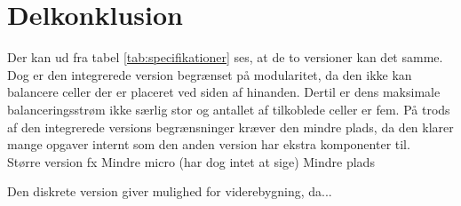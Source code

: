 \section{Delkonklusion}
Der kan ud fra tabel \ref{tab:specifikationer} ses, at de to versioner kan det samme. Dog er den integrerede version begrænset på modularitet, da den ikke kan balancere celler der er placeret ved siden af hinanden. Dertil er dens maksimale balanceringsstrøm ikke særlig stor og antallet af tilkoblede celler er fem. På trods af den integrerede versions begrænsninger kræver den mindre plads, da den klarer mange opgaver internt som den anden version har ekstra komponenter til.
\\
Større version fx
Mindre micro (har dog intet at sige)
Mindre plads



Den diskrete version giver mulighed for viderebygning, da...